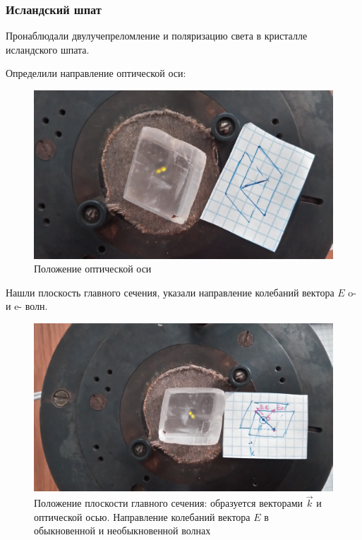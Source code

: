 \subsubsection{Исландский шпат}

Пронаблюдали двулучепреломление и поляризацию света в кристалле исландского шпата. 

Определили направление оптической оси:
\begin{figure}[H]
	\centering
	\includegraphics[width=\textwidth]{pic/rot_eo.jpg}
	\caption{Положение оптической оси}
	\label{fig:figure1}
\end{figure}

Нашли плоскость главного сечения, указали направление колебаний вектора $E$ o- и e- волн.
\begin{figure}[H]
	\centering
	\includegraphics[width=\textwidth]{pic/eo.jpg}
	\caption{Положение плоскости главного сечения: образуется векторами $\vec{k}$ и оптической осью. Направление колебаний вектора $E$ в обыкновенной и необыкновенной волнах}
	\label{fig:figure1}
\end{figure}

